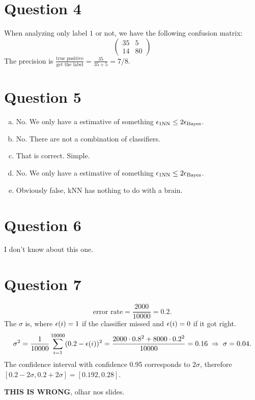 \documentclass[a4paper,fleqn,12pt]{article}
\begin{document}
\section{Question 4}

When analyzing only label $1$ or not, we have the following confusion matrix:
$$
\begin{pmatrix}
35 & 5 \\
14 & 80
\end{pmatrix}
$$
The precision is $\frac{\text{true positive}}{\text{get the label}} = \frac{35}{35 + 5} = 7/8$.

\section{Question 5}

\begin{enumerate}[(a)]
\item No. We only have a estimative of something $\epsilon_{\text{1NN}} \leq 2 \epsilon_{\text{Bayes}}$.
\item No. There are not a combination of classifiers.
\item That is correct. Simple.
\item No. We only have a estimative of something $\epsilon_{\text{1NN}} \leq 2 \epsilon_{\text{Bayes}}$.
\item Obviously false, kNN has nothing to do with a brain.
\end{enumerate}

\section{Question 6}

I don't know about this one.

\section{Question 7}

$$
\text{error rate} = \frac{2000}{10000} = 0.2.
$$
The $\sigma$ is, where $\epsilon(i) = 1$ if the classifier missed and $\epsilon(i) = 0$ if it got right.
$$
\sigma^2 = \frac{1}{10000} \sum_{i=1}^{10000} (0.2 - \epsilon(i))^2 =
\frac{2000 \cdot 0.8^2 + 8000 \cdot 0.2^2}{10000} = 0.16 \; \Rightarrow \; \sigma = 0.04.
$$
The confidence interval with confidence 0.95 corresponds to $2\sigma$, therefore $[0.2 - 2\sigma, 0.2 + 2\sigma] = [0.192, 0.28]$.

\textbf{THIS IS WRONG}, olhar nos slides.
\end{document}
